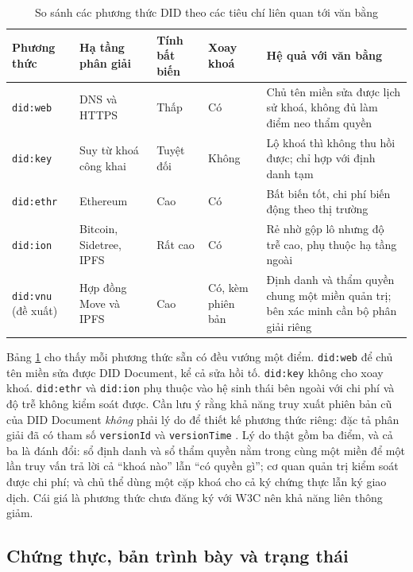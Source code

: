 \begin{table}[H]
\centering
\caption{So sánh các phương thức DID theo các tiêu chí liên quan tới văn bằng}
\label{tab:v2-did-method}
\renewcommand{\arraystretch}{1.25}
\small
\begin{tabular}{|p{2.0cm}|p{2.7cm}|p{2.2cm}|p{1.6cm}|p{4.6cm}|}
\hline
\textbf{Phương thức} & \textbf{Hạ tầng phân giải} & \textbf{Tính bất biến} & \textbf{Xoay khoá} & \textbf{Hệ quả với văn bằng} \\ \hline
\texttt{did:web} & DNS và HTTPS & Thấp & Có & Chủ tên miền sửa được lịch sử khoá, không đủ làm điểm neo thẩm quyền \\ \hline
\texttt{did:key} & Suy từ khoá công khai & Tuyệt đối & Không & Lộ khoá thì không thu hồi được; chỉ hợp với định danh tạm \\ \hline
\texttt{did:ethr} & Ethereum & Cao & Có & Bất biến tốt, chi phí biến động theo thị trường \\ \hline
\texttt{did:ion} & Bitcoin, Sidetree, IPFS & Rất cao & Có & Rẻ nhờ gộp lô nhưng độ trễ cao, phụ thuộc hạ tầng ngoài \\ \hline
\texttt{did:vnu} (đề xuất) & Hợp đồng Move và IPFS & Cao & Có, kèm phiên bản & Định danh và thẩm quyền chung một miền quản trị; bên xác minh cần bộ phân giải riêng \\ \hline
\end{tabular}
\end{table}

Bảng \ref{tab:v2-did-method} cho thấy mỗi phương thức sẵn có đều vướng một điểm. \texttt{did:web} \cite{DIDWeb2023} để chủ tên miền sửa được DID Document, kể cả sửa hồi tố. \texttt{did:key} \cite{DIDKey2022} không cho xoay khoá. \texttt{did:ethr} \cite{DIDEthr2023} và \texttt{did:ion} \cite{DIDION2021} phụ thuộc vào hệ sinh thái bên ngoài với chi phí và độ trễ không kiểm soát được. Cần lưu ý rằng khả năng truy xuất phiên bản cũ của DID Document \emph{không} phải lý do để thiết kế phương thức riêng: đặc tả phân giải đã có tham số \texttt{versionId} và \texttt{versionTime} \cite{W3C_DIDResolution}. Lý do thật gồm ba điểm, và cả ba là đánh đổi: sổ định danh và sổ thẩm quyền nằm trong cùng một miền để một lần truy vấn trả lời cả ``khoá nào'' lẫn ``có quyền gì''; cơ quan quản trị kiểm soát được chi phí; và chủ thể dùng một cặp khoá cho cả ký chứng thực lẫn ký giao dịch. Cái giá là phương thức chưa đăng ký với W3C nên khả năng liên thông giảm.

\subsection{Chứng thực, bản trình bày và trạng thái}

